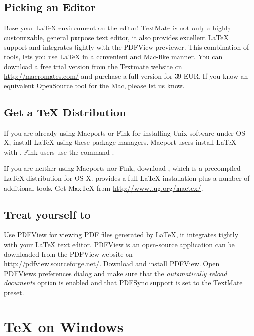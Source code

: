 \documentclass[11pt,a4paper,twoside]{book}
\begin{document}
\subsection{Picking an Editor}

Base your LaTeX environment on the  editor! TextMate is not
only a highly customizable, general purpose text editor, it also provides
excellent LaTeX support and integrates tightly with the PDFView previewer.
This combination of tools, lets you use LaTeX in a convenient and Mac-like
manner. You can download a free trial version from the Textmate website on
\url{http://macromates.com/} and purchase a full version for 39 EUR. If you
know an equivalent OpenSource tool for the Mac, please let us know.

\subsection{Get a \TeX{} Distribution}

If you are already using Macports or Fink for installing Unix software under
OS X, install LaTeX using these package managers. Macport users install
LaTeX with ,
Fink users use the command .

If you are neither using Macports nor Fink, download , which is a
precompiled LaTeX distribution for OS X.  provides a full LaTeX
installation plus a number of additional tools. Get MaxTeX from
\url{http://www.tug.org/mactex/}.

\subsection{Treat yourself to }

Use PDFView for viewing PDF files generated by LaTeX, it integrates tightly
with your LaTeX text editor. PDFView is an open-source application can be
downloaded from the PDFView website on\\
\url{http://pdfview.sourceforge.net/}. Download and install PDFView. Open
PDFViews preferences dialog and make sure that the \emph{automatically reload
documents} option is enabled and that PDFSync support is set to the TextMate
preset.

\section{\TeX{} on Windows}
\end{document}
